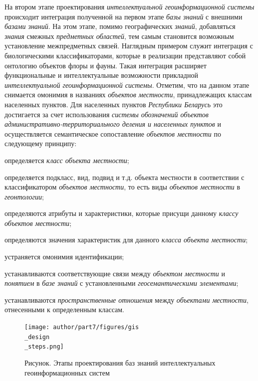 На втором этапе проектирования \textit{интеллектуальной геоинформационной системы} происходит интеграция полученной на первом этапе \textit{базы знаний} с внешними \textit{базами знаний}. На этом этапе, помимо географических \textit{знаний}, добавляться \textit{знания} смежных \textit{предметных областей}, тем самым становится возможным установление межпредметных связей. Наглядным примером служит интеграция с биологическими классификаторами, которые в реализации представляют собой онтологию объектов флоры и фауны. Такая интеграция расширяет функциональные и интеллектуальные возможности прикладной \textit{интеллектуальной геоинформационной системы}. Отметим, что на данном этапе снимается омонимия в названиях \textit{объектов местности}, принадлежащих классам населенных пунктов. Для населенных пунктов \textit{Республики Беларусь} это достигается за счет использования \textit{системы обозначений объектов административно-территориального деления и населенных пунктов} и осуществляется семантическое сопоставление \textit{объектов местности} по следующему принципу:
\begin{textitemize}
	\item определяется \textit{класс объекта местности\scnsupergroupsign};
	\item определяется подкласс, вид, подвид и т.д. объекта местности в соответствии с классификатором \textit{объектов местности}, то есть виды \textit{объектов местности} в \textit{геонтологии};
	\item определяются атрибуты и характеристики, которые присущи данному \textit{классу объектов местности\scnsupergroupsign};
	\item определяются значения характеристик для данного \textit{класса объекта местности\scnsupergroupsign};
	\item устраняется омонимия идентификации;
	\item устанавливаются соответствующие связи между \textit{объектом местности} и \textit{понятием} в \textit{базе знаний} с установленными \textit{геосемантическими элементами};
	\item устанавливаются \textit{пространственные отношения} между \textit{объектами местности}, отнесенными к определенным классам.
\end{textitemize}

\begin{figure}[H]
	\center
	\caption{Рисунок. Этапы проектирования баз знаний интеллектуальных геоинформационных систем}
	\texttt{[image: author/part7/figures/gis\\\_design\\\_steps.png]}
	\label{fig:gis_design_steps}
\end{figure}

